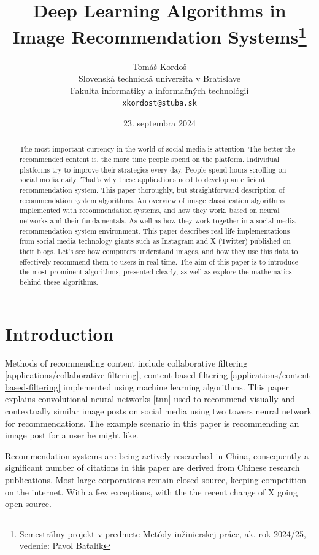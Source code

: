\documentclass[10pt,english,a4paper]{article}
\title{Deep Learning Algorithms in Image Recommendation Systems\thanks{Semestrálny projekt v predmete Metódy inžinierskej práce, ak. rok 2024/25, vedenie: Pavol Baťalík}}
\author{Tomáš Kordoš\\[2pt]
	{\small Slovenská technická univerzita v Bratislave}\\
	{\small Fakulta informatiky a informačných technológií}\\
	{\small \texttt{xkordost@stuba.sk}}
}
\date{\small 23. septembra 2024}
\begin{document}
\maketitle

\begin{abstract}
The most important currency in the world of social media is attention. The better the recommended content is, the more time people spend on the platform. Individual platforms try to improve their strategies every day. People spend hours scrolling on social media daily. That's why these applications need to develop an efficient recommendation system. This paper thoroughly, but straightforward description of recommendation system algorithms. An overview of image classification algorithms implemented with recommendation systems, and how they work, based on neural networks and their fundamentals. As well as how they work together in a social media recommendation system environment.  This paper describes real life implementations from social media technology giants such as Instagram and X (Twitter) published on their blogs. Let's see how computers understand images, and how they use this data to effectively recommend them to users in real time. The aim of this paper is to introduce the most prominent algorithms, presented clearly, as well as explore the mathematics behind these algorithms. 
\end{abstract}


\section{Introduction} \label{introduction}

Methods of recommending content include collaborative filtering \ref{applications/collaborative-filtering}, content-based filtering \ref{applications/content-based-filtering} implemented using machine learning algorithms.\cite{10142790} This paper explains convolutional neural networks \ref{tnn} used to recommend visually and contextually similar image posts on social media using two towers neural network for recommendations. The example scenario in this paper is recommending an image post for a user he might like.

Recommendation systems are being actively researched in China, consequently a significant number of citations in this paper are derived from Chinese research 
publications. Most large corporations remain closed-source, keeping competition on the internet. With a few exceptions, with the the recent change of X going open-source. 
\end{document}
